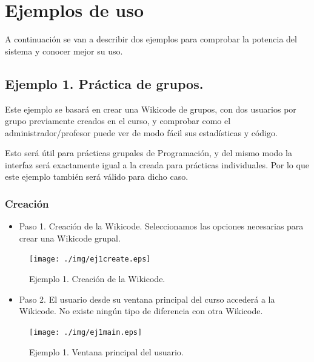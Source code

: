 \chapter[Ejemplos de uso]{\label{}
Ejemplos de uso}

A continuación se van a describir dos ejemplos para comprobar la potencia del sistema y conocer mejor su uso. 

\vspace{1cm}

\section{Ejemplo 1. Práctica de grupos.}

Este ejemplo se basará en crear una Wikicode de grupos, con dos usuarios por grupo previamente creados en el curso, y comprobar como el administrador/profesor puede ver de modo fácil sus estadísticas y código.

Esto será útil para prácticas grupales de Programación, y del mismo modo la interfaz será exactamente igual a la creada para prácticas individuales. Por lo que este ejemplo también será válido para dicho caso.

\newpage

\subsection{Creación}

\begin{itemize}
	\item Paso 1. Creación de la Wikicode. Seleccionamos las opciones necesarias para crear una Wikicode grupal.
\end{itemize}

\begin{figure}[h]
	\label{fig:ej1create}
	\texttt{[image: ./img/ej1create.eps]}
	\caption{Ejemplo 1. Creación de la Wikicode.}
\end{figure}

\newpage

\begin{itemize}
	\item Paso 2. El usuario desde su ventana principal del curso accederá a la Wikicode. No existe ningún tipo de diferencia con otra Wikicode.
\end{itemize}

\begin{figure}[h]
	\label{fig:ej1main}
	\texttt{[image: ./img/ej1main.eps]}
	\caption{Ejemplo 1. Ventana principal del usuario.}
\end{figure}

